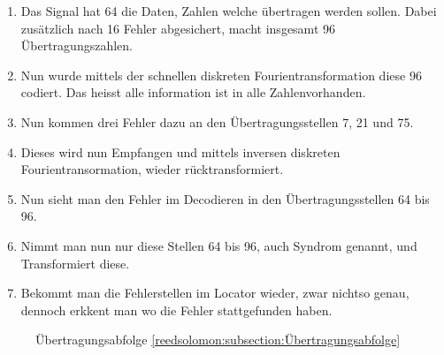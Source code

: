 \begin{enumerate}[1)]
\item Das Signal hat 64 die Daten, Zahlen welche übertragen werden sollen. 
Dabei zusätzlich nach 16 Fehler abgesichert, macht insgesamt 96 Übertragungszahlen.
\item Nun wurde mittels der schnellen diskreten Fourientransformation diese 96 codiert.
Das heisst alle information ist in alle Zahlenvorhanden.
\item Nun kommen drei Fehler dazu an den Übertragungsstellen 7, 21 und 75.
\item Dieses wird nun Empfangen und mittels inversen diskreten Fourientransormation, wieder rücktransformiert.
\item Nun sieht man den Fehler im Decodieren in den Übertragungsstellen 64 bis 96.
\item Nimmt man nun nur diese Stellen 64 bis 96, auch Syndrom genannt, und Transformiert diese.
\item Bekommt man die Fehlerstellen im Locator wieder, zwar nichtso genau, dennoch erkkent man wo die Fehler stattgefunden haben.
\end{enumerate}

\begin{figure}
	\centering
	\caption{Übertragungsabfolge \ref{reedsolomon:subsection:Übertragungsabfolge}}
	\label{fig:sendorder}
\end{figure}
